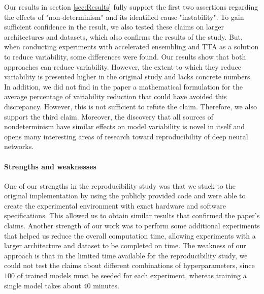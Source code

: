Our results in section \ref{sec:Results} fully support the first two assertions regarding the effects of "non-determinism" and its identified cause "instability". To gain sufficient confidence in the result, we also tested these claims on larger architectures and datasets, which also confirms the results of the study. But, when conducting experiments with accelerated ensembling and TTA as a solution to reduce variability, some differences were found. Our results show that both approaches can reduce variability. However, the extent to which they reduce variability is presented higher in the original study and lacks concrete numbers. In addition, we did not find in the paper a mathematical formulation for the average percentage of variability reduction that could have avoided this discrepancy. However, this is not sufficient to refute the claim. Therefore, we also support the third claim. Moreover, the discovery that all sources of nondeterminism have similar effects on model variability is novel in itself and opens many interesting areas of research toward reproducibility of deep neural networks.

\paragraph{Strengths and weaknesses}
One of our strengths in the reproducibility study was that we stuck to the original implementation by using the publicly provided code and were able to create the experimental environment with exact hardware and software specifications. This allowed us to obtain similar results that confirmed the paper's claims. Another strength of our work was to perform some additional experiments that helped us reduce the overall computation time, allowing experiments with a larger architecture and dataset to be completed on time. The weakness of our approach is that in the limited time available for the reproducibility study, we could not test the claims about different combinations of hyperparameters, since $100$ of trained models must be seeded for each experiment, whereas training a single model takes about $40$ minutes.

